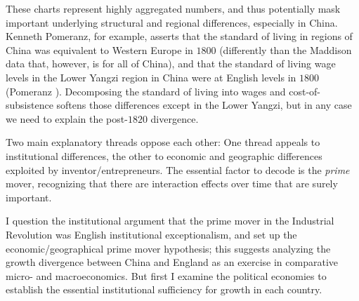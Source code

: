 \documentclass[12pt]{article}
\numberwithin{equation}{section}
\begin{document}
\begin{comment}
		\begin{figure}[htb]
		\centering
		\texttt{[image: 1900gdp.png]}
		\caption{World GDP shares, 1900 CE}
		\label{fig:1900gdp}
		\end{figure}
		
		Figures \ref{fig:1500gdp}, \ref{fig:1820gdp}, and \ref{fig:1900gdp} trace the path of global GDP shares from CE $1500$ through $1900$ grouped by major regions. We see China's gobal GDP share staying roughly in line with its populations share, so peaking in $1820$ at the end of the world proto-industrial era.
		
		England's GDP share has grown dramatically, from the $1\%$ proportional to its population share in $1500$, to $2.5$ times population share in $1820$, to $3$ times population share in $1900$.
		
\end{comment}
		These charts represent highly aggregated numbers, and thus potentially mask important underlying structural and regional differences, especially in China. Kenneth Pomeranz, for example, asserts that the standard of living in regions of China was equivalent to Western Europe in $1800$ (differently than the Maddison data that, however, is for all of China), and that the standard of living wage levels in the Lower Yangzi region in China were at English levels in $1800$ (Pomeranz \citeyear[p.~107]{pomeranz_great_2001}). Decomposing the standard of living into wages and cost-of-subsistence softens those differences except in the Lower Yangzi, but in any case we need to explain the post-$1820$ divergence.
		
		Two main explanatory threads oppose each other: One thread appeals to institutional differences, the other to economic and geographic differences exploited by inventor/entrepreneurs. The essential factor to decode is the \textit{prime} mover, recognizing that there are interaction effects over time that are surely important.
		
		I question the institutional argument that the prime mover in the Industrial Revolution was English institutional exceptionalism, and set up the economic/geographical prime mover hypothesis; this suggests analyzing the growth divergence between China and England as an exercise in comparative micro- and macroeconomics. But first I examine the political economies to establish the essential institutional sufficiency for growth in each country.
		\newpage
\end{document}
